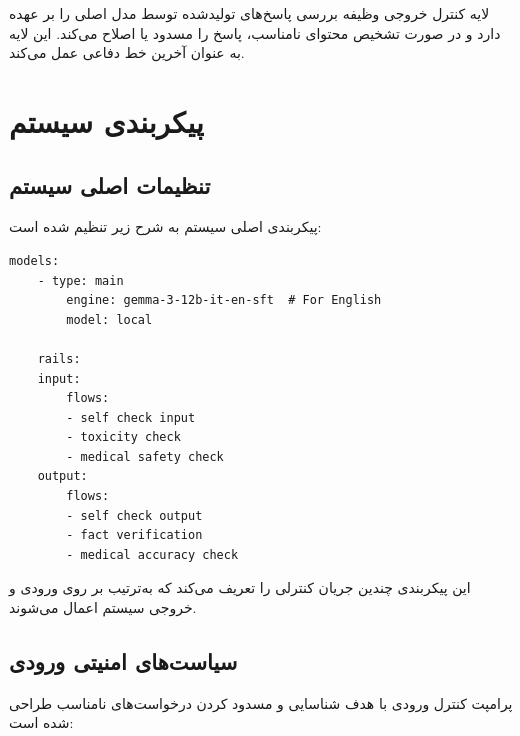 \documentclass[11pt, a4paper, oneside]{book}
\begin{document}
	لایه کنترل خروجی وظیفه بررسی پاسخ‌های تولیدشده توسط مدل اصلی را بر عهده دارد و در صورت تشخیص محتوای نامناسب، پاسخ را مسدود یا اصلاح می‌کند. این لایه به عنوان آخرین خط دفاعی عمل می‌کند.

	\section{پیکربندی سیستم }

	\subsection{تنظیمات اصلی سیستم}

	پیکربندی اصلی سیستم  به شرح زیر تنظیم شده است:

	\begin{latin}
	\begin{lstlisting}[caption={\rl{پیکربندی سیستم}}]
	models:
	- type: main
		engine: gemma-3-12b-it-en-sft  # For English
		model: local
		
	rails:
	input:
		flows:
		- self check input
		- toxicity check
		- medical safety check
	output:
		flows:
		- self check output
		- fact verification
		- medical accuracy check
	\end{lstlisting}
	\end{latin}

	این پیکربندی چندین جریان کنترلی را تعریف می‌کند که به‌ترتیب بر روی ورودی و خروجی سیستم اعمال می‌شوند.

	\subsection{سیاست‌های امنیتی ورودی}

	پرامپت کنترل ورودی با هدف شناسایی و مسدود کردن درخواست‌های نامناسب طراحی شده است:
\end{document}
